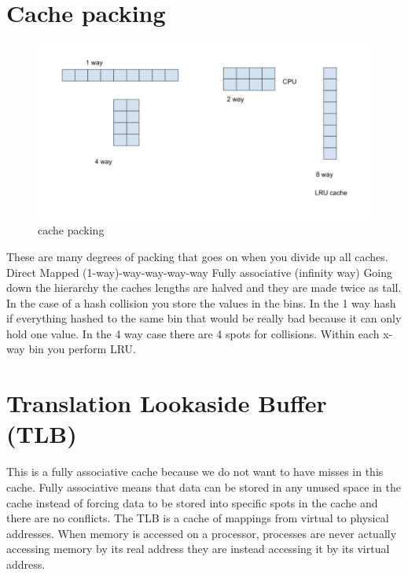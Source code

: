 \documentclass[twoside]{article}
\begin{document}
\section{Cache packing}
\begin{figure}[h!]
  \includegraphics[width=\linewidth]{fig7.png}
  \caption{cache packing}
  \label{fig:fig7}
\end{figure}
These are many degrees of packing that goes on when you divide up all caches. 
\newline
Direct Mapped (1-way)-way-way-way-way\newline
Fully associative (infinity way)\newline
Going down the hierarchy the caches lengths are halved and they are made twice as tall. In the case of a hash collision you store the values in the bins. In the 1 way hash if everything hashed to the same bin that would be really bad because it can only hold one value. In the 4 way case there are 4 spots for collisions. Within each x-way bin you perform LRU.

\section{Translation Lookaside Buffer (TLB)}
This is a fully associative cache because we do not want to have misses in this cache. Fully associative means that data can be stored in any unused space in the cache instead of forcing data to be stored into specific spots in the cache and there are no conflicts. The TLB is a cache of mappings from virtual to physical addresses. 
\newline
When memory is accessed on a processor,  processes are never actually accessing memory by its real address they are instead accessing it by its virtual address. 
\end{document}
